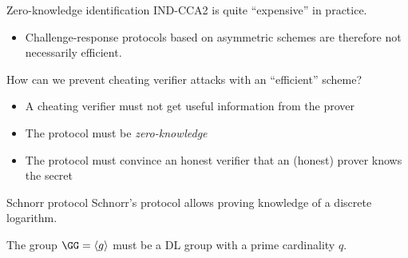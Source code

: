 \begin{frame}{Zero-knowledge identification}
  IND-CCA2 is quite \enquote{expensive} in practice.
  \begin{itemize}[<+(1)->]
    \item Challenge-response protocols based on asymmetric schemes are therefore not necessarily efficient.
  \end{itemize}

  \vspace*{1em}

  \pause
  How can we prevent cheating verifier attacks with an \enquote{efficient} scheme?
  \begin{itemize}[<+(1)->]
    \item A cheating verifier must not get useful information from the prover
    \item The protocol must be \emph{zero-knowledge}
    \item The protocol must convince an honest verifier that an (honest) prover knows the secret
  \end{itemize}
\end{frame}

\begin{frame}{Schnorr protocol}
  Schnorr's protocol allows proving knowledge of a discrete logarithm.

  \pause
  \begin{center}
  \end{center}

  The group $\GG = \langle g\rangle$ must be a DL group with a prime cardinality $q$.
\end{frame}


